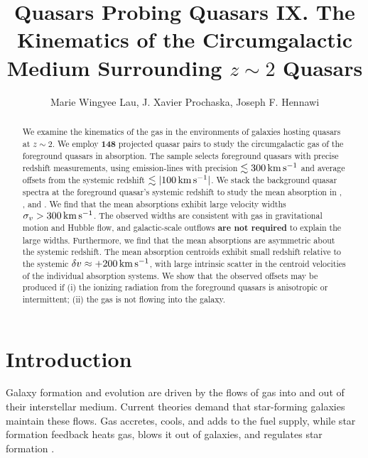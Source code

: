 \documentclass[iop]{emulateapj}
\begin{document}
\title{Quasars Probing Quasars IX. The Kinematics of the Circumgalactic Medium Surrounding 
$z\sim2$ Quasars}

\author{Marie Wingyee Lau, J. Xavier Prochaska, 
Joseph F. Hennawi
}

\begin{abstract}
We examine the kinematics of the gas in the environments of galaxies hosting quasars at $z\sim2$. 
We employ {\bf 148} projected quasar pairs to study the circumgalactic gas of the foreground quasars in
absorption. The sample selects foreground quasars with precise redshift measurements, using 
emission-lines with precision $\lesssim300\,{\rm km\,s^{-1}}$ and average offsets from the 
systemic redshift $\lesssim|100\,{\rm km\,s^{-1}}|$. We stack the background quasar spectra at the 
foreground quasar's systemic redshift to study the mean absorption in , , 
and . We find that the mean absorptions exhibit large velocity widths 
$\sigma_v>300\,{\rm km\,s^{-1}}$. The observed widths are consistent with gas in gravitational 
motion and Hubble flow, and galactic-scale outflows {\bf are not required} to explain the large
widths. Furthermore, we find that the mean absorptions are asymmetric about the systemic redshift. 
The mean absorption centroids exhibit small redshift relative to the 
systemic $\delta v\approx+200\,{\rm km\,s^{-1}}$, with large intrinsic scatter in the centroid 
velocities of the individual absorption systems. We show that the observed offsets may be produced 
if (i) the ionizing radiation from the foreground quasars is anisotropic or intermittent; (ii) the 
gas is not flowing into the galaxy.  
\end{abstract}



\section{Introduction}
\label{sec:introduction}

Galaxy formation and evolution are driven by the flows of gas into and out of their interstellar 
medium. Current theories demand that star-forming galaxies maintain these flows. Gas accretes, 
cools, and adds to the fuel supply, while star formation feedback heats gas, blows it out of 
galaxies, and regulates star formation \citep[for a review see][]{SomervilleDave15}. 
\end{document}

